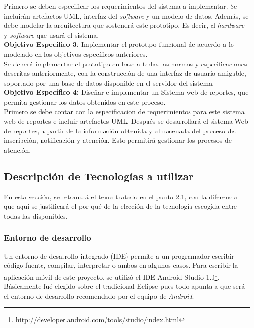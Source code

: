 Primero se deben especificar los requerimientos del sistema a implementar. Se incluirán artefactos UML, interfaz del \textit{software} y un modelo de datos. Además, se debe modelar  la arquitectura que sostendrá este prototipo. Es decir,  el \textit{hardware} y \textit{software} que usará el sistema.\\

\textbf{Objetivo Específico 3:} Implementar el prototipo funcional de acuerdo a lo modelado en los objetivos específicos anteriores.\\

Se deberá implementar el prototipo en base a todas las normas y especificaciones descritas anteriormente, con la construcción de una interfaz de usuario amigable, soportado por una base de datos disponible en el servidor del sistema.\\

\textbf{Objetivo Específico 4:} Diseñar e implementar un Sistema web de reportes, que permita gestionar los datos obtenidos en este proceso.\\

Primero se debe contar con la especificacion de requerimientos para este sistema web de reportes e incluir artefactos UML. Después se desarrollará el sistema Web de reportes, a partir de la información obtenida y almacenada del proceso de: inscripción, notificación y atención. Esto permitirá gestionar los procesos de atención.\\


\subsection{Descripción de Tecnologías a utilizar}

En esta sección, se retomará el tema tratado en el punto 2.1, con la diferencia que aquí se justificará el por qué de la elección de la tecnología escogida entre todas las disponibles.\\

\subsubsection{Entorno de desarrollo}

Un entorno de desarrollo integrado (IDE) permite a un programador escribir código fuente, compilar, interpretar o ambos en algunos casos. Para escribir la aplicación móvil de este proyecto, se utilizó el IDE Android Studio 1.0\footnote{http://developer.android.com/tools/studio/index.html}. Básicamente fué elegido sobre el tradicional Eclipse pues todo apunta a que será el entorno de desarrollo recomendado por el equipo de \textit{Android}.\\

